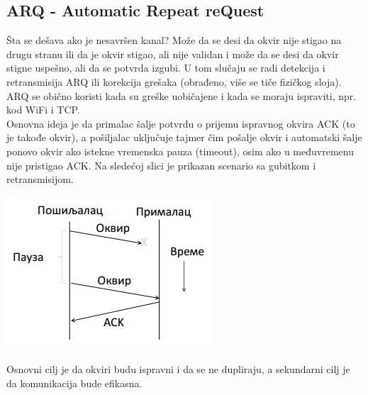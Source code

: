\documentclass{article} %
\begin{document}
\subsection{ARQ - Automatic Repeat reQuest}
Šta se dešava ako je nesavršen kanal? Može da se desi da okvir nije stigao na drugu stranu ili da je okvir stigao, ali nije validan i može da se desi da okvir stigne uspešno, ali da se potvrda izgubi. U tom slučaju se radi detekcija i retransmisija ARQ ili korekcija grešaka (obrađeno, više se tiče fizičkog sloja). 
\\
ARQ se obično koristi kada su greške uobičajene i kada se moraju ispraviti, npr. kod WiFi i TCP.\\
Osnovna ideja je da primalac šalje potvrdu o prijemu ispravnog okvira ACK (to je takođe okvir), a pošiljalac uključuje tajmer čim pošalje okvir i automatski šalje ponovo okvir ako istekne vremenska pauza (timeout), osim ako u međuvremenu nije pristigao ACK.
Na sledećoj slici je prikazan scenario sa gubitkom i retransmisijom.
\begin{center}
	\includegraphics[scale=0.5]{ARQ1}
\end{center}
Osnovni cilj je da okviri budu ispravni i da se ne dupliraju, a sekundarni cilj je da komunikacija bude efikasna.\\
\end{document}
